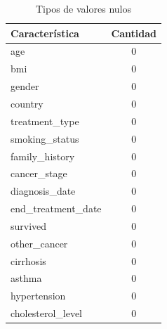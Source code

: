 \documentclass[10pt,journal,compsoc]{IEEEtran}
\begin{document}
\begin{table}[h!]
\centering
\begin{tabular}{|l|c|}
\hline
\textbf{Característica}   & \textbf{Cantidad}  \\ \hline
age                     &  0 \\ \hline
bmi                     &  0 \\ \hline
gender                  &  0 \\ \hline
country                 &  0 \\ \hline
treatment\_type         &  0 \\ \hline
smoking\_status         &  0 \\ \hline
family\_history         &  0 \\ \hline
cancer\_stage           &  0 \\ \hline
diagnosis\_date         &  0 \\ \hline
end\_treatment\_date    &  0 \\ \hline
survived                &  0 \\ \hline
other\_cancer           &  0 \\ \hline
cirrhosis               &  0 \\ \hline
asthma                  &  0 \\ \hline
hypertension            &  0 \\ \hline
cholesterol\_level      &  0 \\ \hline
\end{tabular}
\caption{Tipos de valores nulos}
\label{tab:valoresNulos}
\end{table}
\end{document}
